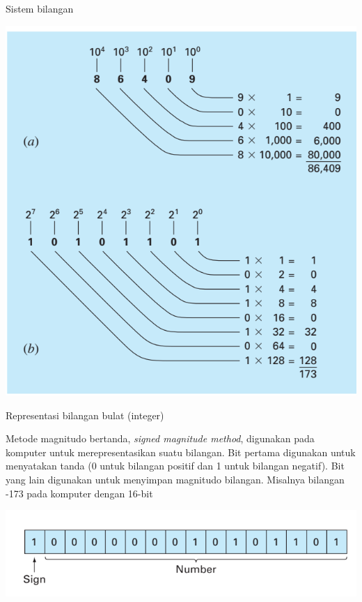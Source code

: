 \begin{frame}{Sistem bilangan}

{\centering
\includegraphics[height=0.8\textheight]{../chapra_7th/Chapra_Fig_3_5.png}
\par}

\end{frame}


\begin{frame}{Representasi bilangan bulat (integer)}

Metode magnitudo bertanda, \textit{signed magnitude method}, digunakan pada komputer
untuk merepresentasikan suatu bilangan. Bit pertama digunakan untuk menyatakan tanda
(0 untuk bilangan positif dan 1 untuk bilangan negatif).
Bit yang lain digunakan untuk menyimpan magnitudo bilangan.
Misalnya bilangan -173 pada komputer dengan 16-bit

{\centering
\includegraphics[height=0.3\textheight]{../chapra_7th/Chapra_Fig_3_6.png}
\par}

\end{frame}



